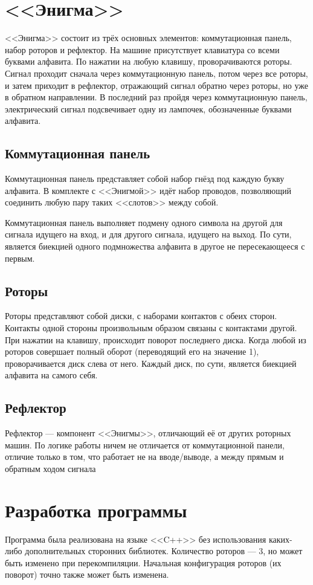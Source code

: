 \documentclass[14pt, oneside, a4paper]{extreport}
\begin{document}

\setcounter{page}{2}

\chapter{<<Энигма>>}
<<Энигма>> состоит из трёх основных элементов: коммутационная панель, набор роторов и рефлектор. На машине присутствует клавиатура со всеми буквами алфавита. По нажатии на любую клавишу, проворачиваются роторы. Сигнал проходит сначала через коммутационную панель, потом через все роторы, и затем приходит в рефлектор, отражающий сигнал обратно через роторы, но уже в обратном направлении. В последний раз пройдя через коммутационную панель, электрический сигнал подсвечивает одну из лампочек, обозначенные буквами алфавита.

\section{Коммутационная панель}
Коммутационная панель представляет собой набор гнёзд под каждую букву алфавита. В комплекте с <<Энигмой>> идёт набор проводов, позволяющий соединить любую пару таких <<слотов>> между собой.

Коммутационная панель выполняет подмену одного символа на другой для сигнала идущего на вход, и для другого сигнала, идущего на выход. По сути, является биекцией одного подмножества алфавита в другое не пересекающееся с первым.

\section{Роторы}
Роторы представляют собой диски, с наборами контактов с обеих сторон. Контакты одной стороны произвольным образом связаны с контактами другой. При нажатии на клавишу, происходит поворот последнего диска. Когда любой из роторов совершает полный оборот (переводящий его на значение 1), проворачивается диск слева от него. Каждый диск, по сути, является биекцией алфавита на самого себя.

\section{Рефлектор}
Рефлектор --- компонент <<Энигмы>>, отличающий её от других роторных машин. По логике работы ничем не отличается от коммутационной панели, отличие только в том, что работает не на вводе/выводе, а между прямым и обратным ходом сигнала

\chapter{Разработка программы}
Программа была реализована на языке <<C++>> без использования каких-либо дополнительных сторонних библиотек. Количество роторов --- 3, но может быть изменено при перекомпиляции. Начальная конфигурация роторов (их поворот) точно также может быть изменена.
\end{document}
